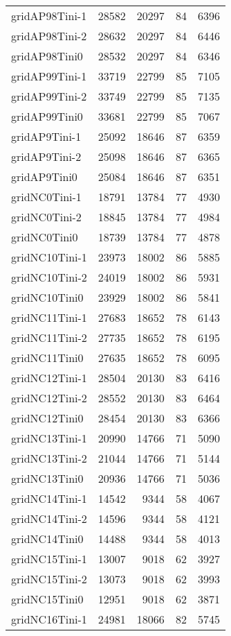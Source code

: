 \begin{longtable}{lrrrr}
gridAP98Tini-1 & 28582 & 20297 & 84 & 6396 \\
gridAP98Tini-2 & 28632 & 20297 & 84 & 6446 \\
gridAP98Tini0 & 28532 & 20297 & 84 & 6346 \\
gridAP99Tini-1 & 33719 & 22799 & 85 & 7105 \\
gridAP99Tini-2 & 33749 & 22799 & 85 & 7135 \\
gridAP99Tini0 & 33681 & 22799 & 85 & 7067 \\
gridAP9Tini-1 & 25092 & 18646 & 87 & 6359 \\
gridAP9Tini-2 & 25098 & 18646 & 87 & 6365 \\
gridAP9Tini0 & 25084 & 18646 & 87 & 6351 \\
gridNC0Tini-1 & 18791 & 13784 & 77 & 4930 \\
gridNC0Tini-2 & 18845 & 13784 & 77 & 4984 \\
gridNC0Tini0 & 18739 & 13784 & 77 & 4878 \\
gridNC10Tini-1 & 23973 & 18002 & 86 & 5885 \\
gridNC10Tini-2 & 24019 & 18002 & 86 & 5931 \\
gridNC10Tini0 & 23929 & 18002 & 86 & 5841 \\
gridNC11Tini-1 & 27683 & 18652 & 78 & 6143 \\
gridNC11Tini-2 & 27735 & 18652 & 78 & 6195 \\
gridNC11Tini0 & 27635 & 18652 & 78 & 6095 \\
gridNC12Tini-1 & 28504 & 20130 & 83 & 6416 \\
gridNC12Tini-2 & 28552 & 20130 & 83 & 6464 \\
gridNC12Tini0 & 28454 & 20130 & 83 & 6366 \\
gridNC13Tini-1 & 20990 & 14766 & 71 & 5090 \\
gridNC13Tini-2 & 21044 & 14766 & 71 & 5144 \\
gridNC13Tini0 & 20936 & 14766 & 71 & 5036 \\
gridNC14Tini-1 & 14542 & 9344 & 58 & 4067 \\
gridNC14Tini-2 & 14596 & 9344 & 58 & 4121 \\
gridNC14Tini0 & 14488 & 9344 & 58 & 4013 \\
gridNC15Tini-1 & 13007 & 9018 & 62 & 3927 \\
gridNC15Tini-2 & 13073 & 9018 & 62 & 3993 \\
gridNC15Tini0 & 12951 & 9018 & 62 & 3871 \\
gridNC16Tini-1 & 24981 & 18066 & 82 & 5745 \\

\end{longtable}

